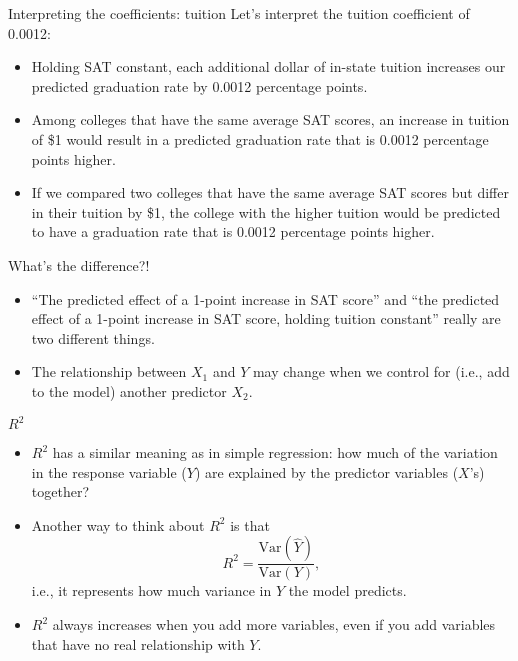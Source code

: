 \documentclass{beamer}\usepackage[]{graphicx}\usepackage[]{color}
\begin{document}
\begin{darkframes}
    \begin{frame}{Interpreting the coefficients: tuition}
      Let's interpret the tuition coefficient of 0.0012:
      \begin{itemize}[<+->]
        \item \alert{Holding SAT constant}, each additional dollar of in-state tuition increases our predicted graduation rate by 0.0012 percentage points.
        \item \alert{Among colleges that have the same average SAT scores}, an increase in tuition of \$1 would result in a predicted graduation rate that is 0.0012 percentage points higher.
        \item \alert{If we compared two colleges that have the same average SAT scores but differ in their tuition by \$1}, the college with the higher tuition would be predicted to have a graduation rate that is 0.0012 percentage points higher.
      \end{itemize}
    \end{frame}

    \begin{frame}{What's the difference?!}
      \begin{itemize}[<+->]
        \item ``The predicted effect of a 1-point increase in SAT score'' and ``the predicted effect of a 1-point increase in SAT score, holding tuition constant'' really are \alert{two different things}.
        \item The relationship between $X_1$ and $Y$ may change when we \alert{control for} (i.e., add to the model) another predictor $X_2$.
      \end{itemize}
    \end{frame}

    \begin{frame}{$R^2$}
      \begin{itemize}[<+->]
        \item $R^2$ has a similar meaning as in simple regression: how much of the variation in the response variable ($Y$) are explained by the predictor variables ($X$'s) together?
        \item Another way to think about $R^2$ is that \[ R^2 = \frac{\text{Var}(\hat Y)}{\text{Var}(Y)}, \] i.e., it represents how much variance in $Y$ the model predicts.
        \item $R^2$ always increases when you add more variables, \alert{even if you add variables that have no real relationship with $Y$}.
      \end{itemize}
    \end{frame}


\end{darkframes}
\end{document}
